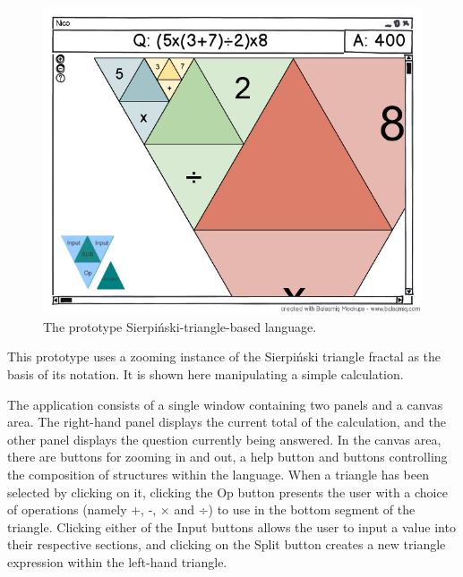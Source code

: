 \documentclass[12pt,twoside,notitlepage,xetex]{report}
\begin{document}
\begin{figure}[H]
\begin{center}
\includegraphics[width=\textwidth]{figs/mockups/sierp/sierp_mockup_full.png}
\caption{The prototype Sierpiński-triangle-based language.}
\end{center}
\end{figure}

This prototype uses a zooming instance of the Sierpiński triangle fractal as
the basis of its notation.  It is shown here manipulating a simple calculation.

The application consists of a single window containing two panels and a canvas
area.  The right-hand panel displays the current total of the calculation,
and the other panel displays the question currently being answered.  In the
canvas area, there are buttons for zooming in and out, a help button and
buttons controlling the composition of structures within the language.  When a
triangle has been selected by clicking on it, clicking the {\sfapp Op} button
presents the user with a choice of operations (namely +, -, × and ÷) to use in
the bottom segment of the triangle.  Clicking either of the {\sfapp Input}
buttons allows the user to input a value into their respective sections, and
clicking on the {\sfapp Split} button creates a new triangle expression within
the left-hand triangle.
\end{document}
